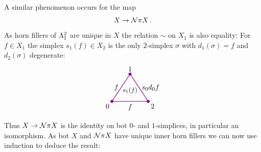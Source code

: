         A similar phenomenon occurs for the map
        \begin{equation*}
            X \to \mathcal{N} \pi X \,.
        \end{equation*}
        As horn fillers of $\Lambda^{2}_{1}$ are unique in $X$ the relation $\sim$ on $X_1$ is also equality: For $f \in X_1$ the simplex $s_1(f) \in X_2$ is the only $2$-simplex $\sigma$ with $d_1(\sigma) = f$ and $d_2(\sigma)$ degenerate:
        \begin{equation*}
            \begin{tikzpicture}[
                scale=0.9, 
                thick, 
                color=violet, 
                every node/.style={text=black},
                dot/.style={circle, fill=violet, inner sep=1.5pt, outer sep=0pt}
            ]

                \coordinate (O) at (0,0);       %
                \coordinate (A) at (1, 1.5);    %
                \coordinate (B) at (2, 0);      %

                \draw (O) -- node[left] {$f$} (A) 
                    -- node[right] {$s_0 d_0 f$} (B) 
                    -- node[below] {$f$} cycle;

                \node[dot] at (O) {};
                \node[dot] at (A) {};
                \node[dot] at (B) {};

                \node[below left] at (O) {0};
                \node[above] at (A) {1};
                \node[below right] at (B) {2};

                \node[scale=0.9] at (1, 0.6) {$s_1(f)$};

            \end{tikzpicture}          
        \end{equation*}
        Thus $X \to \mathcal{N} \pi X$ is the identity on bot $0$- and $1$-simplices, in particular an isomorphism. As bot $X$ and $\mathcal{N} \pi X$ have unique inner horn fillers we can now use induction to deduce the result:

